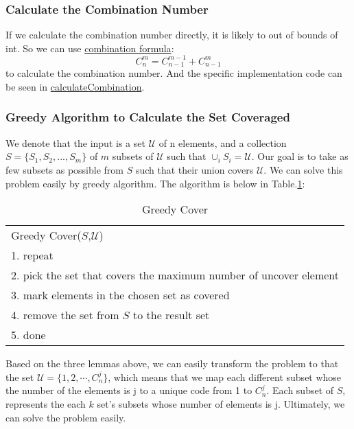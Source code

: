     \subsubsection{Calculate the Combination Number}
    If we calculate the combination number directly, it is likely to out of bounds of int. So we can use \hyperref[fol:C]{combination formula}:
    \label{fol:C}$$C_n^m=C_{n-1}^{m-1}+C_{n-1}^m$$ 
    to calculate the combination number. And the specific implementation code can be seen in \hyperref[code:calComb]{calculateCombination}.
   \label{code:calComb}
   
    
    \subsubsection{Greedy Algorithm to Calculate the Set Coveraged}
    We denote that the input is a set $\mathcal{U}$ of n elements, and a collection $S=\{S_1, S_2, . . . , S_m\}$ of $m$ subsets of $\mathcal{U}$ such that
    $\cup_{i} S_i=\mathcal{U}$. Our goal is to take as few subsets as possible from $S$ such that their union covers $\mathcal{U}$.
    We can solve this problem easily by greedy algorithm. The algorithm is below in Table.\ref{tab:Greedy Cover}:
    \begin{table}[!hpbt]
        \centering
        \begin{tabular}{|l|}
        \hline
        Greedy Cover($S$,$\mathcal{U}$)                                       \\
        1. repeat                                                             \\
        2. pick the set that covers the maximum number of uncover element \\
        3. mark elements in the chosen set as covered                     \\
        4. remove the set from $S$ to the result set                      \\
        5. done                                                               \\ \hline
        \end{tabular}
        \caption{Greedy Cover}
        \label{tab:Greedy Cover}
    \end{table}

Based on the three lemmas above, we can easily transform the problem to that the set $\mathcal{U}=\{1,2,\cdots, C^j_n\}$, which means that we map each different subset 
whose the number of the elements is j to a unique code from 1 to $ C^j_n$. Each subset of $S$, represents the each $k$ set's subsets whose number of elements is j. Ultimately, 
we can solve the problem easily.
